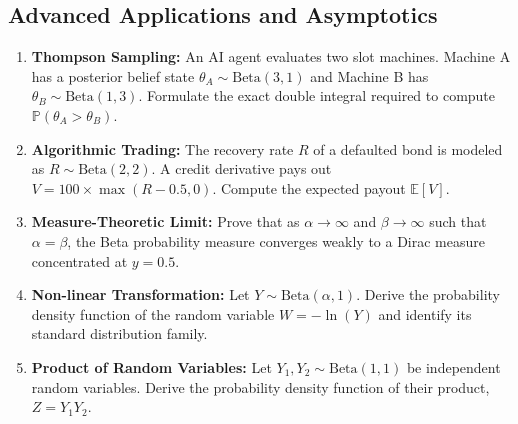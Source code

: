 \documentclass[11pt, a4paper]{article}
\theoremstyle{definition}
\theoremstyle{remark}
\newcommand{\E}{\mathbb{E}}
\newcommand{\Prob}{\mathbb{P}}
\begin{document}
\subsection{Advanced Applications and Asymptotics}
\begin{enumerate}[label=\textbf{\arabic*.}, resume]
    \item \textbf{Thompson Sampling:} An AI agent evaluates two slot machines. Machine A has a posterior belief state $\theta_A \sim \text{Beta}(3, 1)$ and Machine B has $\theta_B \sim \text{Beta}(1, 3)$. Formulate the exact double integral required to compute $\Prob(\theta_A > \theta_B)$.
    \item \textbf{Algorithmic Trading:} The recovery rate $R$ of a defaulted bond is modeled as $R \sim \text{Beta}(2, 2)$. A credit derivative pays out $V = 100 \times \max(R - 0.5, 0)$. Compute the expected payout $\E[V]$.
    \item \textbf{Measure-Theoretic Limit:} Prove that as $\alpha \to \infty$ and $\beta \to \infty$ such that $\alpha = \beta$, the Beta probability measure converges weakly to a Dirac measure concentrated at $y = 0.5$.
    \item \textbf{Non-linear Transformation:} Let $Y \sim \text{Beta}(\alpha, 1)$. Derive the probability density function of the random variable $W = -\ln(Y)$ and identify its standard distribution family.
    \item \textbf{Product of Random Variables:} Let $Y_1, Y_2 \sim \text{Beta}(1, 1)$ be independent random variables. Derive the probability density function of their product, $Z = Y_1 Y_2$.
\end{enumerate}
\end{document}
